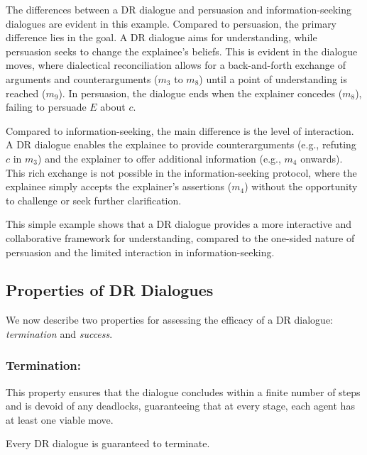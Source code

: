 \documentclass{article}
\begin{document}
The differences between a DR dialogue and persuasion and information-seeking dialogues are %
evident in this example. Compared to persuasion, the primary difference lies in the goal. A DR dialogue aims for understanding, while persuasion seeks to change the explainee's beliefs. This is evident in the dialogue moves, where dialectical reconciliation allows for a back-and-forth exchange of arguments and counterarguments ($m_3$ to $m_8$) until a point of understanding is reached ($m_9$). In persuasion, the dialogue ends when the explainer concedes ($m_8$), failing to persuade $E$ about $c$.


Compared to information-seeking, the main difference is the level of interaction. A DR dialogue enables the explainee to provide counterarguments (e.g., refuting $c$ in $m_3$) and the explainer to offer additional information (e.g., $m_4$ onwards). This rich exchange is not possible in the information-seeking protocol, where the explainee simply accepts the explainer's assertions ($m_4$) without the opportunity to challenge or seek further clarification.

This simple example shows that a DR dialogue provides a more interactive and collaborative framework for understanding, compared to the one-sided nature of persuasion and the limited interaction in information-seeking.













\subsection{Properties of DR Dialogues}
\label{properties}

We now describe two properties for assessing the efficacy of a DR dialogue: \emph{termination} and \emph{success}. 

\subsubsection{Termination:} This property ensures that the dialogue concludes within a finite number of steps and is devoid of any deadlocks, guaranteeing that at every stage, each agent has at least one viable move.

\begin{theorem}
    Every DR dialogue is guaranteed to terminate.
    \label{term_theo}
\end{theorem}
\end{document}
